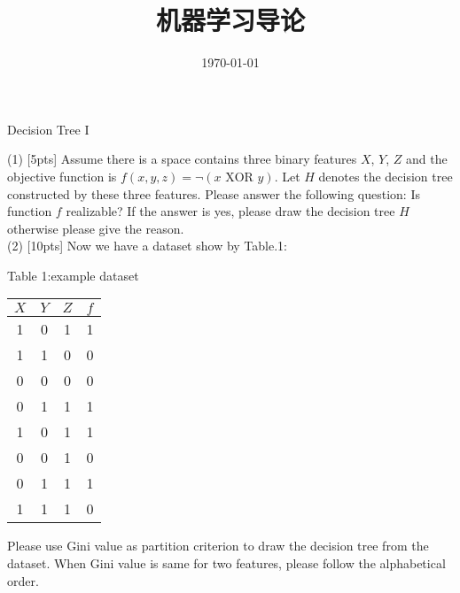 \documentclass[11pt, a4paper, UTF8]{ctexart}
\title{机器学习导论}
\date{\today}
\begin{document}
\maketitle
\noplagiarism

\beginthishw
\begin{problem}[ML problem 1]
Decision Tree I


 (1) [5pts] Assume there is a space contains three binary features $X$, $Y$, $Z$ and the objective function is $f(x,y,z)=\neg(x \text{ XOR } y)$. Let $H$ denotes the decision tree constructed by these three features. Please answer the following question: Is function $f$ realizable? If the answer is yes, please draw the decision tree $H$ otherwise please give the reason.\\
(2) [10pts] Now we have a dataset show by Table.1:\\
\begin{center}
	Table 1:example dataset\\
	\begin{tabular}{ccc|c}
		\hline
		$X$ & $Y$ & $Z$ & $f$\\
		\hline
		1 & 0 & 1 & 1\\
		1 & 1 & 0 & 0\\
		0 & 0 & 0 & 0\\
		0 & 1 & 1 & 1\\
		1 & 0 & 1 & 1\\
		0 & 0 & 1 & 0\\
		0 & 1 & 1 & 1\\
		1 & 1 & 1 & 0\\
		\hline
	\end{tabular}
\end{center}
Please use Gini value as partition criterion to draw the decision tree from the dataset. When Gini value is same for two features, please follow the alphabetical order.\\



\end{problem}
\end{document}
